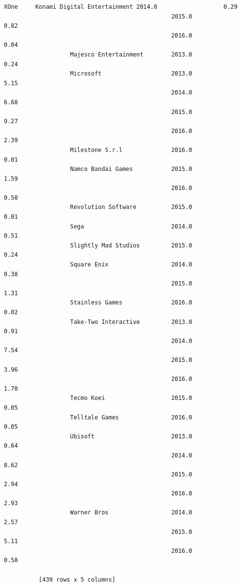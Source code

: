 \documentclass[11pt]{article}
\begin{document}
\begin{Verbatim}[commandchars=\\\{\}]
          XOne     Konami Digital Entertainment 2014.0                   0.29  
                                                2015.0                   0.82  
                                                2016.0                   0.04  
                   Majesco Entertainment        2013.0                   0.24  
                   Microsoft                    2013.0                   5.15  
                                                2014.0                   6.68  
                                                2015.0                   9.27  
                                                2016.0                   2.39  
                   Milestone S.r.l              2016.0                   0.01  
                   Namco Bandai Games           2015.0                   1.59  
                                                2016.0                   0.50  
                   Revolution Software          2015.0                   0.01  
                   Sega                         2014.0                   0.51  
                   Slightly Mad Studios         2015.0                   0.24  
                   Square Enix                  2014.0                   0.38  
                                                2015.0                   1.31  
                   Stainless Games              2016.0                   0.02  
                   Take-Two Interactive         2013.0                   0.91  
                                                2014.0                   7.54  
                                                2015.0                   3.96  
                                                2016.0                   1.70  
                   Tecmo Koei                   2015.0                   0.05  
                   Telltale Games               2016.0                   0.05  
                   Ubisoft                      2013.0                   0.64  
                                                2014.0                   8.62  
                                                2015.0                   2.94  
                                                2016.0                   2.93  
                   Warner Bros                  2014.0                   2.57  
                                                2015.0                   5.11  
                                                2016.0                   0.58  
          
          [439 rows x 5 columns]
\end{Verbatim}
            
\end{document}
